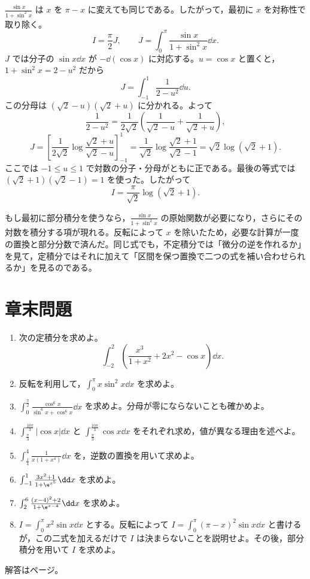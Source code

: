 $\frac{\sin x}{1+\sin^2x}$ は $x$ を $\pi-x$ に変えても同じである。したがって，最初に $x$ を対称性で取り除く。
\[
I=\frac{\pi}{2}J,\qquad
J=\int_0^\pi\frac{\sin x}{1+\sin^2x}\dd x.
\]
$J$ では分子の $\sin x\dd x$ が $-\dd(\cos x)$ に対応する。$u=\cos x$ と置くと，$1+\sin^2x=2-u^2$ だから
\[
J=\int_{-1}^1\frac{1}{2-u^2}\dd u.
\]
この分母は $(\sqrt2-u)(\sqrt2+u)$ に分かれる。よって
\[
\frac{1}{2-u^2}
 =\frac{1}{2\sqrt2}\left(\frac{1}{\sqrt2-u}+\frac{1}{\sqrt2+u}\right),
\]
\[
J=\left[\frac{1}{2\sqrt2}
\log\frac{\sqrt2+u}{\sqrt2-u}\right]_{-1}^1
 =\frac{1}{\sqrt2}\log\frac{\sqrt2+1}{\sqrt2-1}
 =\sqrt2\log(\sqrt2+1).
\]
ここでは $-1\leq u\leq1$ で対数の分子・分母がともに正である。最後の等式では $(\sqrt2+1)(\sqrt2-1)=1$ を使った。したがって
\[
I=\frac{\pi}{\sqrt2}\log(\sqrt2+1).
\]

もし最初に部分積分を使うなら，$\frac{\sin x}{1+\sin^2x}$ の原始関数が必要になり，さらにその対数を積分する項が現れる。反転によって $x$ を除いたため，必要な計算が一度の置換と部分分数で済んだ。同じ式でも，不定積分では「微分の逆を作れるか」を見て，定積分ではそれに加えて「区間を保つ置換で二つの式を補い合わせられるか」を見るのである。

\section*{章末問題}
\begin{enumerate}[label=\textbf{\thechapter.\arabic*},leftmargin=*]
\item\label{問:奇偶の混合}
次の定積分を求めよ。
\[
\int_{-2}^2\left(\frac{x^3}{1+x^2}+2x^2-\cos x\right)\dd x.
\]
\item\label{問:一次重み反転}
反転を利用して，$\int_0^\pi x\sin^2x\dd x$ を求めよ。
\item\label{問:三角相補}
$\int_0^{\frac{\pi}{2}}\frac{\cos^6x}{\sin^6x+\cos^6x}\dd x$ を求めよ。分母が零にならないことも確かめよ。
\item\label{問:周期絶対値}
$\int_{\frac{\pi}{3}}^{\frac{10\pi}{3}}|\cos x|\dd x$ と
$\int_{\frac{\pi}{3}}^{\frac{10\pi}{3}}\cos x\dd x$ をそれぞれ求め，値が異なる理由を述べよ。
\item\label{問:逆数四乗}
$\int_{\frac14}^{4}\frac{1}{x(1+x^4)}\dd x$ を，逆数の置換を用いて求めよ。
\item\label{問:指数相補}
$\int_{-1}^1\frac{3x^2+1}{1+\e^{x^5}}\dd x$ を求めよ。
\item\label{問:中心を移す相補}
$\int_2^6\frac{(x-4)^2+2}{1+\e^{x-4}}\dd x$ を求めよ。
\item\label{問:二次重みの限界}
$I=\int_0^\pi x^2\sin x\dd x$ とする。反転によって
$I=\int_0^\pi(\pi-x)^2\sin x\dd x$ と書けるが，この二式を加えるだけで $I$ は決まらないことを説明せよ。その後，部分積分を用いて $I$ を求めよ。
\end{enumerate}

\smallskip\noindent 解答は\pageref{解答:第7章}ページ。
